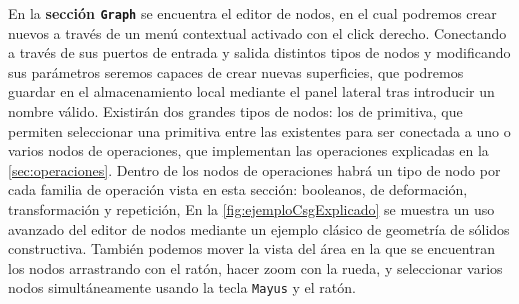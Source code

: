 En la \textbf{sección \texttt{Graph}} se encuentra el editor de nodos, en el cual podremos crear nuevos a través de un menú contextual activado con el click derecho. Conectando a través de sus puertos de entrada y salida distintos tipos de nodos y modificando sus parámetros seremos capaces de crear nuevas superficies, que podremos guardar en el almacenamiento local mediante el panel lateral tras introducir un nombre válido. Existirán dos grandes tipos de nodos: los de primitiva, que permiten seleccionar una primitiva entre las existentes para ser conectada a uno o varios nodos de operaciones, que implementan las operaciones explicadas en la \autoref{sec:operaciones}. Dentro de los nodos de operaciones habrá un tipo de nodo por cada familia de operación vista en esta sección: booleanos, de deformación, transformación y repetición, En la \autoref{fig:ejemploCsgExplicado} se muestra un uso avanzado del editor de nodos mediante un ejemplo clásico de geometría de sólidos constructiva. También podemos mover la vista del área en la que se encuentran los nodos arrastrando con el ratón, hacer zoom con la rueda, y seleccionar varios nodos simultáneamente usando la tecla \texttt{Mayus} y el ratón.\newline
